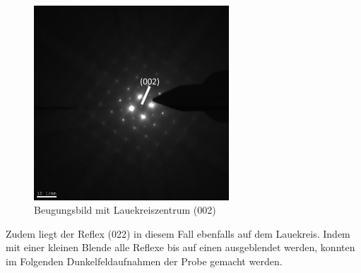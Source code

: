 \documentclass[a4paper,11pt,DIV=11]{scrartcl}
\begin{document}
\begin{figure}[H]\centering
	\includegraphics[width=0.65\textwidth]{Versuchsdaten/9/002.jpg}
\caption{Beugungsbild mit Lauekreiszentrum (002)}
\label{002}
\end{figure}

\newpage

Zudem liegt der Reflex (022) in diesem Fall ebenfalls auf dem Lauekreis. Indem mit einer kleinen Blende alle Reflexe bis auf einen ausgeblendet werden, konnten im Folgenden Dunkelfeldaufnahmen der Probe gemacht werden.
\end{document}
